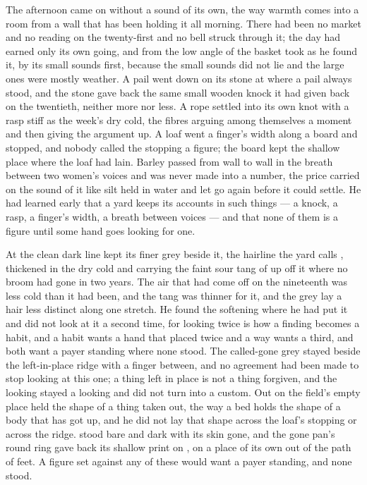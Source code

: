 The afternoon came on without a sound of its own, the way warmth comes into a room from a wall that has been holding it all morning. There had been no market and no reading on the twenty-first and no bell struck through it; the day had earned only its own going, and from the low angle of the basket  took  as he found it, by its small sounds first, because the small sounds did not lie and the large ones were mostly weather. A pail went down on its stone at  where a pail always stood, and the stone gave back the same small wooden knock it had given back on the twentieth, neither more nor less. A rope settled into its own knot with a rasp stiff as the week's dry cold, the fibres arguing among themselves a moment and then giving the argument up. A loaf went a finger's width along a board and stopped, and nobody called the stopping a figure; the board kept the shallow place where the loaf had lain. Barley passed from wall to wall in the breath between two women's voices and was never made into a number, the price carried on the sound of it like silt held in water and let go again before it could settle. He had learned early that a yard keeps its accounts in such things --- a knock, a rasp, a finger's width, a breath between voices --- and that none of them is a figure until some hand goes looking for one.

At  the clean dark line kept its finer grey beside it, the hairline the yard calls , thickened in the dry cold and carrying the faint sour tang of  up off it where no broom had gone in two years. The air that had come off  on the nineteenth was less cold than it had been, and the tang was thinner for it, and the grey lay a hair less distinct along one stretch. He found the softening where he had put it and did not look at it a second time, for looking twice is how a finding becomes a habit, and a habit wants a hand that placed twice and a way wants a third, and both want a payer standing where none stood. The called-gone grey stayed beside the left-in-place ridge with a finger between, and no agreement had been made to stop looking at this one; a thing left in place is not a thing forgiven, and the looking stayed a looking and did not turn into a custom. Out on  the field's empty place held the shape of a thing taken out, the way a bed holds the shape of a body that has got up, and he did not lay that shape across the loaf's stopping or across the ridge.  stood bare and dark with its skin gone, and the gone pan's round ring gave back its shallow print on , on a place of its own out of the path of feet. A figure set against any of these would want a payer standing, and none stood.

